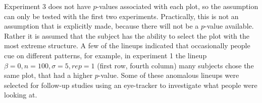 \documentclass[12pt]{article}
\begin{document}
Experiment 3 does not have $p$-values associated with each plot, so the assumption can only be tested with the first two experiments. Practically, this is not an assumption that is explicitly made, because there will not be a $p$-value available. Rather it is assumed that the subject has the ability to select the plot with the most extreme structure. A few of the lineups indicated that occasionally people cue on different patterns, for example, in experiment 1 the lineup $\beta=0, n=100, \sigma=5, rep=1$ (first row, fourth column) many subjects chose the same plot, that had a higher $p$-value. Some of these anomalous lineups were selected for follow-up studies using an eye-tracker to investigate what people were looking at.


\end{document}
